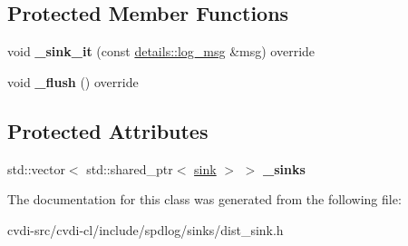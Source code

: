 \subsection*{Protected Member Functions}
\begin{DoxyCompactItemize}
\item 
void {\bfseries \+\_\+sink\+\_\+it} (const \hyperlink{structspdlog_1_1details_1_1log__msg}{details\+::log\+\_\+msg} \&msg) override\hypertarget{classspdlog_1_1sinks_1_1dist__sink_a9458a326a60b6c0183c9ff8ce7aca221}{}\label{classspdlog_1_1sinks_1_1dist__sink_a9458a326a60b6c0183c9ff8ce7aca221}

\item 
void {\bfseries \+\_\+flush} () override\hypertarget{classspdlog_1_1sinks_1_1dist__sink_aeaf56b9977a2c2afb262f6aa3b6f065b}{}\label{classspdlog_1_1sinks_1_1dist__sink_aeaf56b9977a2c2afb262f6aa3b6f065b}

\end{DoxyCompactItemize}
\subsection*{Protected Attributes}
\begin{DoxyCompactItemize}
\item 
std\+::vector$<$ std\+::shared\+\_\+ptr$<$ \hyperlink{classspdlog_1_1sinks_1_1sink}{sink} $>$ $>$ {\bfseries \+\_\+sinks}\hypertarget{classspdlog_1_1sinks_1_1dist__sink_a13027b6f399ae33c5e75aa54f4da4e71}{}\label{classspdlog_1_1sinks_1_1dist__sink_a13027b6f399ae33c5e75aa54f4da4e71}

\end{DoxyCompactItemize}


The documentation for this class was generated from the following file\+:\begin{DoxyCompactItemize}
\item 
cvdi-\/src/cvdi-\/cl/include/spdlog/sinks/dist\+\_\+sink.\+h\end{DoxyCompactItemize}
